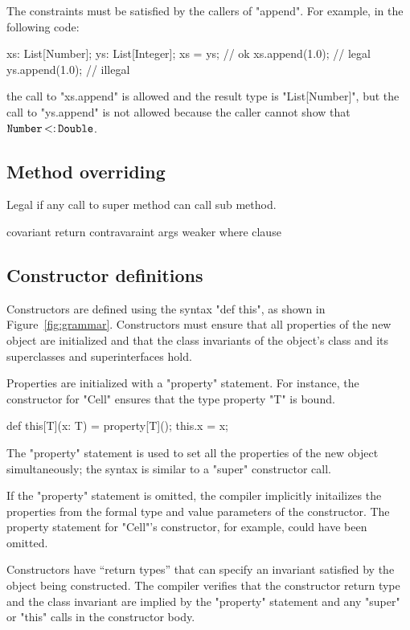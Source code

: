 \documentclass[preprint,nocopyrightspace,9pt]{sigplanconf}
\begin{document}
The constraints must be satisfied by the callers of \xcd"append".
For example, in the following code:
\begin{xten}
xs: List[Number];
ys: List[Integer];
xs = ys; // ok
xs.append(1.0); // legal
ys.append(1.0); // illegal
\end{xten}
the call to \xcd"xs.append" is allowed and the result type is \xcd"List[Number]", but
the call to \xcd"ys.append" is not allowed because the caller cannot show that
${\tt Number} \subtype {\tt Double}$.

\subsection{Method overriding}

Legal if any call to super method can call sub method.

covariant return
contravaraint args
weaker where clause

\subsection{Constructor definitions}

Constructors are defined using the syntax \xcd"def this",
as shown in Figure~\ref{fig:grammar}.
%
Constructors must ensure that all properties of the new object
are initialized and that the class invariants of the object's
class and its superclasses and superinterfaces hold.

Properties are initialized with a \xcd"property" statement.
For instance, the
constructor for \xcd"Cell" ensures that the type property \xcd"T" is bound.
\begin{xten}
    def this[T](x: T) =
      { property[T](); this.x = x; }
\end{xten}
The \xcd"property" statement is used to set all the properties
of the new object simultaneously; the syntax is similar to a \xcd"super"
constructor call.

If the \xcd"property" statement is omitted, the compiler implicitly
initailizes the properties from the formal type and value parameters
of the constructor.  The property statement for \xcd"Cell"'s constructor,
for example, could have been omitted.

Constructors have ``return
types'' that can specify an invariant satisfied by the object being
constructed.  The compiler verifies that the
constructor return type and the class invariant are implied by the
\xcd"property" statement and any \xcd"super"
or \xcd"this" calls in the constructor body.
\end{document}
